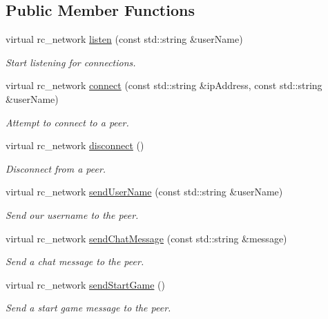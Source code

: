 \subsection*{Public Member Functions}
\begin{DoxyCompactItemize}
\item 
virtual rc\_\-network \hyperlink{classWinsockNetwork_a6f2f806a0e246a46ff6d0c2006cddd43}{listen} (const std::string \&userName)
\begin{DoxyCompactList}\small\item\em Start listening for connections. \item\end{DoxyCompactList}\item 
virtual rc\_\-network \hyperlink{classWinsockNetwork_a0f7f289635183b1082894f230a989006}{connect} (const std::string \&ipAddress, const std::string \&userName)
\begin{DoxyCompactList}\small\item\em Attempt to connect to a peer. \item\end{DoxyCompactList}\item 
virtual rc\_\-network \hyperlink{classWinsockNetwork_abd947a2edb4d5053286f25b4c9f041c1}{disconnect} ()
\begin{DoxyCompactList}\small\item\em Disconnect from a peer. \item\end{DoxyCompactList}\item 
virtual rc\_\-network \hyperlink{classWinsockNetwork_ae76b6c306ef15d162fe652c38c78d4e2}{sendUserName} (const std::string \&userName)
\begin{DoxyCompactList}\small\item\em Send our username to the peer. \item\end{DoxyCompactList}\item 
virtual rc\_\-network \hyperlink{classWinsockNetwork_a420d4e6b5c698476a94dcdb503233de7}{sendChatMessage} (const std::string \&message)
\begin{DoxyCompactList}\small\item\em Send a chat message to the peer. \item\end{DoxyCompactList}\item 
virtual rc\_\-network \hyperlink{classWinsockNetwork_a20ed4411ec34336c6a213b15cc3fcad9}{sendStartGame} ()
\begin{DoxyCompactList}\small\item\em Send a start game message to the peer. \item\end{DoxyCompactList}\item 

\end{DoxyCompactItemize}
